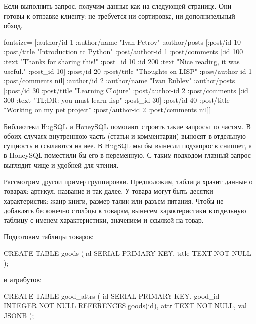 Если выполнить запрос, получим данные как на следующей странице. Они готовы к отправке клиенту: не требуется ни сортировка, ни дополнительный обход.

\begin{english}
  \begin{clojure*}{fontsize=\small}
[{:author/id 1
  :author/name "Ivan Petrov"
  :author/posts
    [{:post/id 10
      :post/title "Introduction to Python"
      :post/author-id 1
      :post/comments
        [{:id 100
          :text "Thanks for sharing this!"
          :post_id 10}
         {:id 200
          :text "Nice reading, it was useful."
          :post_id 10}]}
     {:post/id 20
      :post/title "Thoughts on LISP"
      :post/author-id 1
      :post/comments nil}]}
 {:author/id 2
  :author/name "Ivan Rublev"
  :author/posts
    [{:post/id 30
      :post/title "Learning Clojure"
      :post/author-id 2
      :post/comments
        [{:id 300
          :text "TL;DR: you must learn lisp"
          :post_id 30}]}
     {:post/id 40
      :post/title "Working on my pet project"
      :post/author-id 2
      :post/comments nil}]}]
  \end{clojure*}
\end{english}

Библиотеки HugSQL и HoneySQL помогают строить такие запросы по частям. В обоих случаях внутреннюю часть (статьи и комментарии) выносят в отдельную сущность и ссылаются на нее. В HugSQL мы бы вынесли подзапрос в сниппет, а в HoneySQL поместили бы его в переменную. С таким подходом главный запрос выглядит чище и удобней для чтения.

Рассмотрим другой пример группировки. Предположим, таблица хранит данные о товарах: артикул, название и так далее. У товара могут быть десятки характеристик: жанр книги, размер талии или разъем питания. Чтобы не добавлять бесконечно столбцы к товарам, вынесем характеристики в отдельную таблицу с именем характеристики, значением и ссылкой на товар.

Подготовим таблицы товаров:

\begin{english}
  \begin{sql}
CREATE TABLE goods (
  id SERIAL PRIMARY KEY,
  title TEXT NOT NULL
);
  \end{sql}
\end{english}

\noindent
и атрибутов:

\begin{english}
  \begin{sql}
CREATE TABLE good_attrs (
  id SERIAL PRIMARY KEY,
  good_id INTEGER NOT NULL REFERENCES goods(id),
  attr TEXT NOT NULL,
  val JSONB
);
  \end{sql}
\end{english}

